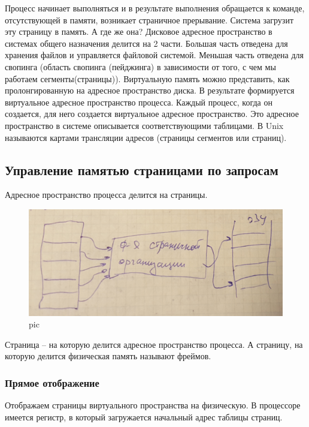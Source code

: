 Процесс начинает выполняться и в результате выполнения обращается к команде, отсутствующей в памяти, возникает страничное прерывание. Система загрузит эту страницу в память. А где же она? Дисковое адресное пространство в системах общего назначения делится на 2 части. Большая часть отведена для хранения файлов и управляется файловой системой. Меньшая часть отведена для свопинга (область свопинга (пейджинга) в зависимости от того, с чем мы работаем сегменты(страницы)). Виртуальную память можно представить, как пролонгированную на адресное пространство диска. В результате формируется виртуальное адресное пространство процесса. Каждый процесс, когда он создается, для него создается виртуальное адресное пространство. Это адресное пространство в системе описывается соответствующими таблицами. В Unix называются картами трансляции адресов (страницы сегментов или страниц).

\subsection{Управление памятью страницами по запросам}

Адресное пространство процесса делится на страницы.

\begin{figure}[H]
    \centering
    \includegraphics[width=\textwidth]{pic/3.png}
    \caption{pic}
\end{figure}

Страница – на которую делится адресное пространство процесса. А страницу, на которую делится физическая память называют фреймов.

\subsubsection{Прямое отображение}
Отображаем страницы виртуального пространства на физическую. В процессоре имеется регистр, в который загружается начальный адрес таблицы страниц.

